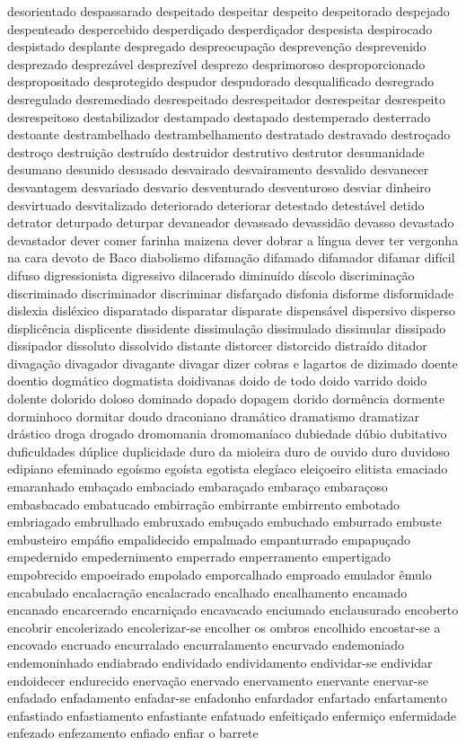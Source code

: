 \documentclass[ruledheader]{abnt_UFF}
\begin{document}
desorientado despassarado despeitado despeitar despeito despeitorado despejado despenteado despercebido desperdi\c{c}ado desperdi\c{c}ador despesista despirocado despistado desplante despregado despreocupa\c{c}\~ao despreven\c{c}\~ao desprevenido desprezado desprez\'{a}vel desprez\'{i}vel desprezo desprimoroso desproporcionado despropositado desprotegido despudor despudorado desqualificado desregrado desregulado desremediado desrespeitado desrespeitador desrespeitar desrespeito desrespeitoso destabilizador destampado destapado destemperado desterrado destoante destrambelhado destrambelhamento destratado destravado destro\c{c}ado destro\c{c}o destrui\c{c}\~ao destru\'{i}do destruidor destrutivo destrutor desumanidade desumano desunido desusado desvairado desvairamento desvalido desvanecer desvantagem desvariado desvario desventurado desventuroso desviar dinheiro desvirtuado desvitalizado deteriorado deteriorar detestado detest\'{a}vel detido detrator deturpado deturpar devaneador devassado devassid\~ao devasso devastado devastador dever comer farinha maizena dever dobrar a l\'{i}ngua dever ter vergonha na cara devoto de Baco diabolismo difama\c{c}\~ao difamado difamador difamar dif\'{i}cil difuso digressionista digressivo dilacerado diminu\'{i}do d\'{i}scolo discrimina\c{c}\~ao discriminado discriminador discriminar disfar\c{c}ado disfonia disforme disformidade dislexia disl\'{e}xico disparatado disparatar disparate dispens\'{a}vel dispersivo disperso displic\^{e}ncia displicente dissidente dissimula\c{c}\~ao dissimulado dissimular dissipado dissipador dissoluto dissolvido distante distorcer distorcido distra\'{i}do ditador divaga\c{c}\~ao divagador divagante divagar dizer cobras e lagartos de dizimado doente doentio dogm\'{a}tico dogmatista doidivanas doido de todo doido varrido doido dolente dolorido doloso dominado dopado dopagem dorido dorm\^{e}ncia dormente dorminhoco dormitar doudo draconiano dram\'{a}tico dramatismo dramatizar dr\'{a}stico droga drogado dromomania dromoman\'{i}aco dubiedade d\'{u}bio dubitativo duficuldades d\'{u}plice duplicidade duro da mioleira duro de ouvido duro duvidoso edipiano efeminado ego\'{i}smo ego\'{i}sta egotista eleg\'{i}aco elei\c{c}oeiro elitista emaciado emaranhado emba\c{c}ado embaciado embara\c{c}ado embara\c{c}o embara\c{c}oso embasbacado embatucado embirra\c{c}\~ao embirrante embirrento embotado embriagado embrulhado embruxado embu\c{c}ado embuchado emburrado embuste embusteiro emp\'{a}fio empalidecido empalmado empanturrado empapu\c{c}ado empedernido empedernimento emperrado emperramento empertigado empobrecido empoeirado empolado emporcalhado emproado emulador \^{e}mulo encabulado encalacra\c{c}\~ao encalacrado encalhado encalhamento encamado encanado encarcerado encarni\c{c}ado encavacado enciumado enclausurado encoberto encobrir encolerizado encolerizar-se encolher os ombros encolhido encostar-se a encovado encruado encurralado encurralamento encurvado endemoniado endemoninhado endiabrado endividado endividamento endividar-se endividar endoidecer endurecido enerva\c{c}\~ao enervado enervamento enervante enervar-se enfadado enfadamento enfadar-se enfadonho enfardador enfartado enfartamento enfastiado enfastiamento enfastiante enfatuado enfeiti\c{c}ado enfermi\c{c}o enfermidade enfezado enfezamento enfiado enfiar o barrete 
\end{document}
